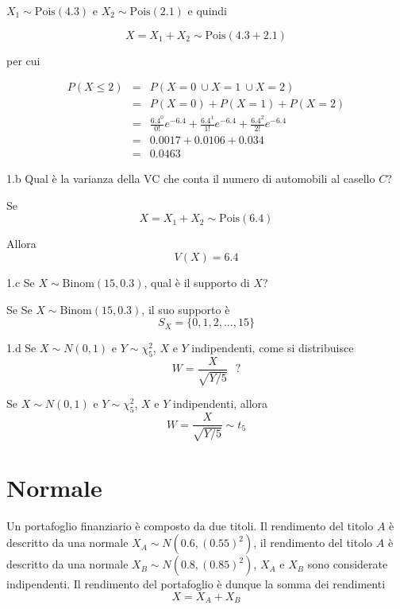 \documentclass[
  11pt,
]{book}
\theoremstyle{mytheoremstyle}
\theoremstyle{mydefstyle}
\newenvironment{sol}
  {
  \begin{tcolorbox}[enhanced,breakable,arc=0.1mm,boxrule=1pt,colback=white,colframe=iblue,
  title=\bf \fontfamily{lmss}\selectfont \hspace{.5 cm} Soluzione,drop fuzzy shadow]

}{
\end{tcolorbox}
  }
\begin{document}
\begin{sol}
\(X_1\sim\text{Pois}(4.3)\) e \(X_2\sim\text{Pois}(2.1)\) e quindi

\[
X=X_1+X_2\sim\text{Pois}(4.3+2.1)
\]

per cui

\begin{eqnarray*}
P(X\le 2) &=& P(X=0\ \cup X=1 \ \cup X=2) \\
          &=& P(X=0)+P(X=1)+P(X=2)\\
          &=& \frac{6.4^0}{0!}e^{-6.4}+\frac{6.4^1}{1!}e^{-6.4}+\frac{6.4^2}{2!}e^{-6.4}\\
          &=& 0.0017+0.0106+0.034\\
          &=& 0.0463
\end{eqnarray*}

\end{sol}

1.b Qual è la varianza della VC che conta il
numero di automobili al casello \(C\)?

\begin{sol}
Se
\[X=X_1+X_2\sim\text{Pois}(6.4)\]

Allora
\[
V(X)=6.4
\]

\end{sol}

1.c Se \(X\sim\text{Binom}(15,0.3)\), qual è il supporto di \(X\)?

\begin{sol}
Se Se \(X\sim\text{Binom}(15,0.3)\), il suo supporto è
\[S_X=\{0,1,2,...,15\}\]

\end{sol}

1.d Se \(X\sim N(0,1)\) e \(Y\sim \chi^2_5\),
\(X\) e \(Y\) indipendenti, come si distribuisce
\[W=\frac X {\sqrt{Y/5}} ~~~?\]

\begin{sol}
Se \(X\sim N(0,1)\) e \(Y\sim \chi^2_5\),
\(X\) e \(Y\) indipendenti, allora
\[W=\frac X {\sqrt{Y/5}} \sim t_5\]

\end{sol}

\section{Normale}\label{normale}

Un portafoglio finanziario è composto da due titoli. Il rendimento del titolo \(A\) è descritto da una normale \(X_A\sim N(0.6,(0.55)^2)\), il rendimento del titolo \(A\) è descritto da una normale \(X_B\sim N(0.8,(0.85)^2)\), \(X_A\) e \(X_B\) sono considerate indipendenti. Il rendimento del portafoglio è dunque la somma dei rendimenti
\[
X=X_A+X_B
\]
\end{document}
